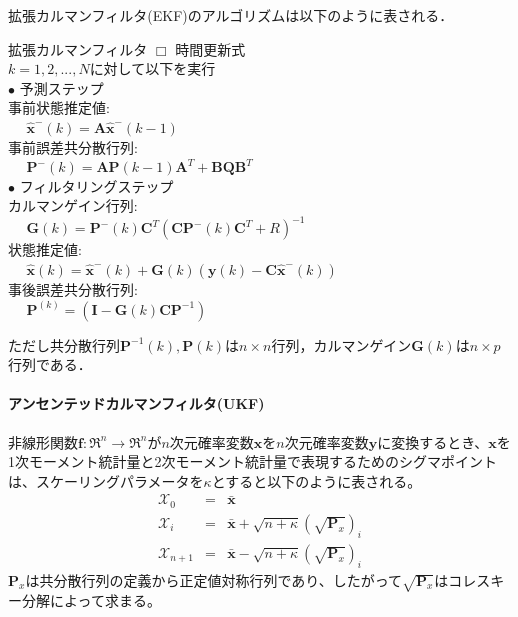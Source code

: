 \documentclass[twocolumn,oneside,a4paper]{article}
\begin{document}
拡張カルマンフィルタ(EKF)のアルゴリズムは以下のように表される．
  \begin{itembox}[l]{拡張カルマンフィルタ}
    $\Box$ 時間更新式\\
    $k=1,2,...,N$に対して以下を実行\\
     $\bullet$ 予測ステップ\\
     事前状態推定値: \\
     $\:\:\:\:\:\: \hat{\bm{x}}^{-}(k) = \bm{A}\hat{\bm{x}}^{-}(k-1)$\\
     事前誤差共分散行列: \\
     $\:\:\:\:\:\: \bm{P}^{-}(k)=\bm{A}\bm{P}(k-1)\bm{A}^{T}+\bm{BQ}\bm{B}^T$\\         
     $\bullet$ フィルタリングステップ\\
     カルマンゲイン行列: \\
     $\:\:\:\:\:\: \bm{G}(k)=\bm{P}^{-}(k)\bm{C}^T(\bm{C}\bm{P}^{-}(k)\bm{C}^{T}+R)^{-1}$\\
     状態推定値: \\
     $\:\:\:\:\:\: \hat{\bm{x}}(k) = \hat{\bm{x}}^{-}(k) + \bm{G}(k)(\bm{y}(k)-\bm{C}\hat{\bm{x}}^{-}(k))$\\
     事後誤差共分散行列: \\
     $\:\:\:\:\:\: \bm{P}^(k)=(\bm{I}-\bm{G}(k)\bm{C}\bm{P}^{-1})$
  \end{itembox}

ただし共分散行列$\bm{P}^{-1}(k), \bm{P}(k)$は$n \times n$行列，カルマンゲイン$\bm{G}(k)$は$n \times p$行列である．



\paragraph{アンセンテッドカルマンフィルタ(UKF)}
非線形関数$\bm{f}: \mathfrak{R}^n \rightarrow \mathfrak{R}^n$が$n$次元確率変数$\bm{x}$を$n$次元確率変数$\bm{y}$に変換するとき、$\bm{x}$を1次モーメント統計量と2次モーメント統計量で表現するためのシグマポイントは、スケーリングパラメータを$\kappa$とすると以下のように表される。
\begin{eqnarray*}
	\mathscr{X}_0 &=& \bar{\bm{x}} \\
	\mathscr{X}_i &=& \bar{\bm{x}} + \sqrt{n+\kappa}(\sqrt{\bm{P}_x})_i\\
	\mathscr{X}_{n+1} &=& \bar{\bm{x}} - \sqrt{n+\kappa}(\sqrt{\bm{P}_x})_i
\end{eqnarray*}
$\bm{P}_x$は共分散行列の定義から正定値対称行列であり、したがって$\sqrt{\bm{P}_x}$はコレスキー分解によって求まる。
\end{document}
